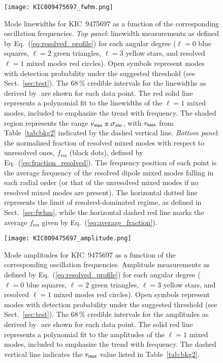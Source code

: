 \begin{figure}
   \centering
   \texttt{[image: KIC009475697\_fwhm.png]}
      \caption{Mode linewidths for KIC~9475697 as a function of the corresponding oscillation frequencies. \textit{Top panel}: linewidth measurements as defined by Eq.~(\ref{eq:resolved_profile}) for each angular degree ($\ell = 0$ blue squares, $\ell = 2$ green triangles, $\ell = 3$ yellow stars, and resolved $\ell = 1$ mixed modes red circles). Open symbols represent modes with detection probability under the suggested threshold (see Sect.~\ref{sec:test}). The 68\,\% credible intervals for the linewidths as derived by \diamonds\,\,are shown for each data point. The red solid line represents a polynomial fit to the linewidths of the $\ell = 1$ mixed modes, included to emphasize the trend with frequency. The shaded region represents the range $\nu_\mathrm{max} \pm \sigma_\mathrm{env}$, with $\nu_\mathrm{max}$ from Table~\ref{tab:bkg2} indicated by the dashed vertical line. \textit{Bottom panel}: the normalized fraction of resolved mixed modes with respect to unresolved ones, $f_\mathrm{res}$ (black dots), defined by Eq.~(\ref{eq:fraction_resolved}). The frequency position of each point is the average frequency of the resolved dipole mixed modes falling in each radial order (or that of the unresolved mixed modes if no resolved mixed modes are present). The horizontal dotted line represents the limit of resolved-dominated regime, as defined in Sect.~\ref{sec:fwhm}, while the horizontal dashed red line marks the average $f_\mathrm{res}$ given by Eq.~(\ref{eq:average_fraction}).}
    \label{fig:9475697fwhm}
\end{figure}

\begin{figure}
   \centering
   \texttt{[image: KIC009475697\_amplitude.png]}
      \caption{Mode amplitudes for KIC~9475697 as a function of the corresponding oscillation frequencies. Amplitude measurements as defined by Eq.~(\ref{eq:resolved_profile}) for each angular degree ($\ell = 0$ blue squares, $\ell = 2$ green triangles, $\ell = 3$ yellow stars, and resolved $\ell = 1$ mixed modes red circles). Open symbols represent modes with detection probability under the suggested threshold (see Sect.~\ref{sec:test}). The 68\,\% credible intervals for the amplitudes as derived by \diamonds\,\,are shown for each data point. The solid red line represents a polynomial fit to the amplitudes of the $\ell = 1$ mixed modes, included to emphasize the trend with frequency. The dashed vertical line indicates the $\nu_\mathrm{max}$ value listed in Table~\ref{tab:bkg2}.}
    \label{fig:9475697amplitude}
\end{figure}
\clearpage


